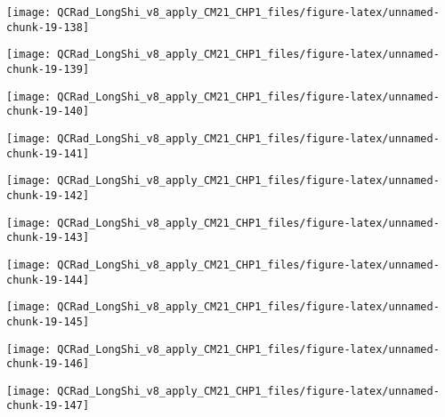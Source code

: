 \documentclass[
  10pt,
  a4paper,oneside]{article}
\begin{document}
\begin{center}\texttt{[image: QCRad\_LongShi\_v8\_apply\_CM21\_CHP1\_files/figure-latex/unnamed-chunk-19-138]} \end{center}

\begin{center}\texttt{[image: QCRad\_LongShi\_v8\_apply\_CM21\_CHP1\_files/figure-latex/unnamed-chunk-19-139]} \end{center}

\begin{center}\texttt{[image: QCRad\_LongShi\_v8\_apply\_CM21\_CHP1\_files/figure-latex/unnamed-chunk-19-140]} \end{center}

\begin{center}\texttt{[image: QCRad\_LongShi\_v8\_apply\_CM21\_CHP1\_files/figure-latex/unnamed-chunk-19-141]} \end{center}

\begin{center}\texttt{[image: QCRad\_LongShi\_v8\_apply\_CM21\_CHP1\_files/figure-latex/unnamed-chunk-19-142]} \end{center}

\begin{center}\texttt{[image: QCRad\_LongShi\_v8\_apply\_CM21\_CHP1\_files/figure-latex/unnamed-chunk-19-143]} \end{center}

\begin{center}\texttt{[image: QCRad\_LongShi\_v8\_apply\_CM21\_CHP1\_files/figure-latex/unnamed-chunk-19-144]} \end{center}

\begin{center}\texttt{[image: QCRad\_LongShi\_v8\_apply\_CM21\_CHP1\_files/figure-latex/unnamed-chunk-19-145]} \end{center}

\begin{center}\texttt{[image: QCRad\_LongShi\_v8\_apply\_CM21\_CHP1\_files/figure-latex/unnamed-chunk-19-146]} \end{center}

\begin{center}\texttt{[image: QCRad\_LongShi\_v8\_apply\_CM21\_CHP1\_files/figure-latex/unnamed-chunk-19-147]} \end{center}
\end{document}
